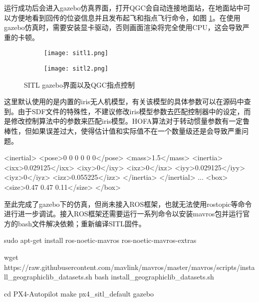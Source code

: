 运行成功后会进入gazebo仿真界面，打开QGC会自动连接地面站，在地面站中可以方便地看到回传的位姿信息并且发布起飞和指点飞行命令，如图 \ref{sitl}。在使用gazebo仿真时，需要安装显卡驱动，否则画面渲染将完全使用CPU，这会导致严重的卡顿。
\begin{figure}[t]
  \centering
     \begin{subfigure}[c]{0.45\textwidth}
      \centering
      \texttt{[image: sitl1.png]}
   \end{subfigure}%
     \begin{subfigure}[c]{0.45\textwidth}
      \centering
      \texttt{[image: sitl2.png]}
   \end{subfigure}
   \caption{SITL gazebo界面以及QGC指点控制}
   \label{sitl}
 \end{figure}
 这里默认使用的是内置的iris无人机模型，有关该模型的具体参数可以在源码\cite{px4}中查到。由于SDF文件的特殊性，不建议修改iris模型参数去匹配控制器中的设定，而是修改控制算法中的参数来匹配iris模型。HOFA算法对于转动惯量参数有一定鲁棒性，但如果误差过大，使得估计值和实际值不在一个数量级还是会导致严重问题。
 \begin{codeblock}[language=C]
  <inertial>
    <pose>0 0 0 0 0 0</pose>
    <mass>1.5</mass>
    <inertia>
      <ixx>0.029125</ixx>
      <ixy>0</ixy>
      <ixz>0</ixz>
      <iyy>0.029125</iyy>
      <iyz>0</iyz>
      <izz>0.055225</izz>
    </inertia>
  </inertial>
...
<box>
  <size>0.47 0.47 0.11</size>
</box>
 \end{codeblock}

至此完成了gazebo下的仿真，但尚未接入ROS框架，也就无法使用rostopic等命令进行进一步调试。接入ROS框架还需要运行一系列命令以安装mavros包并运行官方的bash文件解决依赖；重新编译SITL固件。
\begin{codeblock}
  sudo apt-get install ros-noetic-mavros ros-noetic-mavros-extras

  wget https://raw.githubusercontent.com/mavlink/mavros/master/mavros/scripts/install_geographiclib_datasets.sh
  bash install_geographiclib_datasets.sh

  cd PX4-Autopilot
  make px4_sitl_default gazebo
\end{codeblock}


